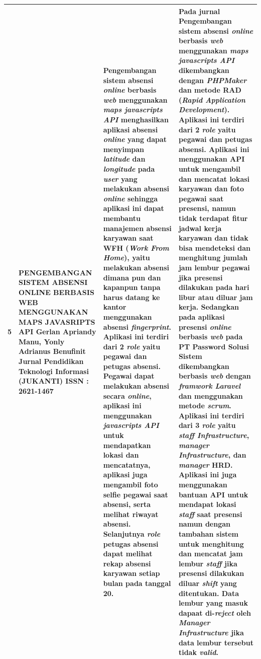 \begin{longtable}{ |p{0.5cm}|p{3cm}|p{7cm}|p{12cm}|  }
 
   5 & PENGEMBANGAN SISTEM ABSENSI ONLINE BERBASIS WEB MENGGUNAKAN MAPS JAVASRIPTS API
 \newline Gerlan Apriandy Manu, Yonly Adrianus Benufinit
 \newline Jurnal Pendidikan Teknologi Informasi (JUKANTI)
 \newline ISSN : 2621-1467
 & Pengembangan sistem absensi \textit{online} berbasis \textit{web} menggunakan \textit{maps javascripts API} menghasilkan aplikasi absensi \textit{online} yang dapat menyimpan \textit{latitude} dan \textit{longitude} pada \textit{user} yang melakukan absensi \textit{online} sehingga aplikasi ini dapat membantu manajemen absensi karyawan saat WFH (\textit{Work From Home}), yaitu melakukan absensi dimana pun dan kapanpun tanpa harus datang ke kantor menggunakan absensi \textit{fingerprint}. Aplikasi ini terdiri dari 2 \textit{role} yaitu pegawai dan petugas absensi. Pegawai dapat melakukan absensi secara \textit{online}, aplikasi ini menggunakan \textit{javascripts API} untuk mendapatkan lokasi dan mencatatnya, aplikasi juga mengambil foto selfie pegawai saat absensi, serta melihat riwayat absensi. Selanjutnya \textit{role} petugas absensi dapat melihat rekap absensi karyawan setiap bulan pada tanggal 20.
 & Pada jurnal Pengembangan sistem absensi \textit{online} berbasis \textit{web} menggunakan \textit{maps javascripts API} dikembangkan dengan \textit{PHPMaker} dan metode RAD (\textit{Rapid Application Development}). Aplikasi ini terdiri dari 2 \textit{role} yaitu pegawai dan petugas absensi. Aplikasi ini menggunakan API untuk mengambil dan mencatat lokasi karyawan dan foto pegawai saat presensi, namun tidak terdapat fitur jadwal kerja karyawan dan tidak bisa mendeteksi dan menghitung jumlah jam lembur pegawai jika presensi dilakukan pada hari libur atau diluar jam kerja.
 \newline 
  \newline
  Sedangkan pada aplikasi presensi \textit{online} berbasis \textit{web} pada PT Password Solusi Sistem dikembangkan berbasis \textit{web} dengan \textit{framwork Laravel} dan menggunakan metode \textit{scrum}. Aplikasi ini terdiri dari 3 \textit{role} yaitu \textit{staff Infrastructure}, \textit{manager Infrastructure}, dan \textit{manager} HRD. Aplikasi ini juga menggunakan bantuan API untuk mendapat lokasi \textit{staff} saat presensi namun dengan tambahan sistem untuk menghitung dan mencatat jam lembur \textit{staff} jika presensi dilakukan diluar \textit{shift} yang ditentukan. Data lembur yang masuk dapaat di-\textit{reject} oleh \textit{Manager Infrastructure} jika data lembur tersebut tidak \textit{valid}.
 \\ \hline


\end{longtable}
